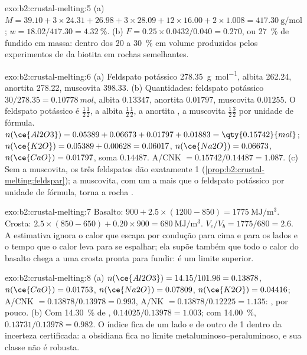 \begin{solution}{exo:b2:crustal-melting:5}
(a) $M = 39.10 + 3\times24.31 + 26.98 + 3\times28.09 + 12\times16.00 + 2\times1.008 =
\qty{417.30}{\gram\per\mole}$; $w = 18.02/417.30 = \qty{4.32}{\percent}$.
(b) $F = 0.25\times0.0432/0.040 = 0.270$, ou \qty{27}{\percent} de fundido em massa: dentro dos
20 a \qty{30}{\percent} em volume produzidos pelos experimentos de  da biotita em
rochas semelhantes.
\end{solution}

\begin{solution}{exo:b2:crustal-melting:6}
(a) Feldspato potássico \qty{278.35}{\gram\per\mole}, albita 262.24, anortita 278.22, muscovita
398.33. (b) Quantidades: feldspato potássico $30/278.35 = \qty{0.10778}{mol}$, albita $0.13347$,
anortita $0.01797$, muscovita $0.01255$. O feldspato potássico é $\tfrac12$$\tfrac12$,
a albita $\tfrac12$$\tfrac12$, a anortita , a muscovita
$\tfrac12$$\tfrac32$ por unidade de fórmula. $n(\ce{Al2O3}) = 0.05389 +
0.06673 + 0.01797 + 0.01883 = \qty{0.15742}{mol}$; $n(\ce{K2O}) = 0.05389 + 0.00628 =
0.06017$, $n(\ce{Na2O}) = 0.06673$, $n(\ce{CaO}) = 0.01797$, soma $0.14487$.
A/CNK $= 0.15742/0.14487 = 1.087$. (c) Sem a muscovita, os três feldspatos dão
exatamente 1 (\cref{prop:b2:crustal-melting:feldspar}); a muscovita, com um 
a mais que o feldspato potássico por unidade de fórmula, torna a rocha .
\end{solution}

\begin{solution}{exo:b2:crustal-melting:7}
Basalto: $900 + 2.5\times(1200 - 850) = \qty{1775}{\mega\joule\per\cubic\metre}$. Crosta:
$2.5\times(850 - 650) + 0.20\times900 = \qty{680}{\mega\joule\per\cubic\metre}$.
$V_c/V_b = 1775/680 = 2.6$. A estimativa ignora o calor que escapa por condução
para cima e para os lados e o tempo que o calor leva para se espalhar; ela supõe também que todo o
calor do basalto chega a uma crosta pronta para fundir: é um limite superior.
\end{solution}

\begin{solution}{exo:b2:crustal-melting:8}
(a) $n(\ce{Al2O3}) = 14.15/101.96 = 0.13878$, $n(\ce{CaO}) = 0.01753$, $n(\ce{Na2O}) =
0.07809$, $n(\ce{K2O}) = 0.04416$; A/CNK $= 0.13878/0.13978 = 0.993$, A/NK $=
0.13878/0.12225 = 1.135$: , por pouco. (b) Com \qty{14.30}{\percent} de ,
$0.14025/0.13978 = 1.003$; com \qty{14.00}{\percent}, $0.13731/0.13978 = 0.982$. O índice
fica de um lado e de outro de 1 dentro da incerteza certificada: a obsidiana fica no
limite metaluminoso--peraluminoso, e sua classe não é robusta.
\end{solution}

